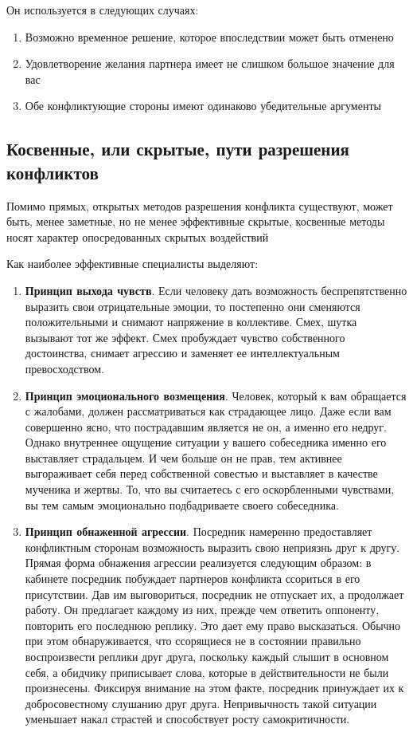 \documentclass[a4paper,14pt]{extarticle}
\begin{document}
\begin{enumerate}
    Он используется в следующих случаях:
    \begin{enumerate}
        \item Возможно временное решение, которое впоследствии может быть отменено
        \item Удовлетворение желания партнера имеет не слишком большое значение для вас
        \item Обе конфликтующие стороны имеют одинаково убедительные аргументы
    \end{enumerate}
\end{enumerate}

\subsection{Косвенные, или скрытые, пути разрешения конфликтов}

Помимо прямых, открытых методов разрешения конфликта существуют, может быть, менее заметные, но не менее эффективные скрытые, косвенные методы носят характер опосредованных скрытых воздействий

Как наиболее эффективные специалисты выделяют:

\begin{enumerate}
    \item \textbf{Принцип выхода чувств}. Если человеку дать возможность беспрепятственно выразить свои отрицательные эмоции, то постепенно они сменяются положительными и снимают напряжение в коллективе. Смех, шутка вызывают тот же эффект. Смех пробуждает чувство собственного достоинства, снимает агрессию и заменяет ее интеллектуальным превосходством.
    \item \textbf{Принцип эмоционального возмещения}. Человек, который к вам обращается с жалобами, должен рассматриваться как страдающее лицо. Даже если вам совершенно ясно, что пострадавшим является не он, а именно его недруг. Однако внутреннее ощущение ситуации у вашего собеседника именно его выставляет страдальцем. И чем больше он не прав, тем активнее выгораживает себя перед собственной совестью и выставляет в качестве мученика и жертвы. То, что вы считаетесь с его оскорбленными чувствами, вы тем самым эмоционально подбадриваете своего собеседника.
    \item \textbf{Принцип обнаженной агрессии}. Посредник намеренно предоставляет конфликтным сторонам возможность выразить свою неприязнь друг к другу. Прямая форма обнажения агрессии реализуется следующим образом: в кабинете посредник побуждает партнеров конфликта ссориться в его присутствии. Дав им выговориться, посредник не отпускает их, а продолжает работу. Он предлагает каждому из них, прежде чем ответить оппоненту, повторить его последнюю реплику. Это дает ему право высказаться. Обычно при этом обнаруживается, что ссорящиеся не в состоянии правильно воспроизвести реплики друг друга, поскольку каждый слышит в основном себя, а обидчику приписывает слова, которые в действительности не были произнесены. Фиксируя внимание на этом факте, посредник принуждает их к добросовестному слушанию друг друга. Непривычность такой ситуации уменьшает накал страстей и способствует росту самокритичности.
\end{enumerate}
\end{document}
